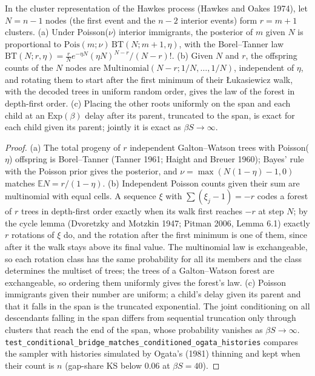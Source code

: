 \begin{proposition}\label{prop:simhawkesbridge}
In the cluster representation of the Hawkes process (Hawkes and Oakes 1974), let $N=n-1$ nodes (the first event and
the $n-2$ interior events) form $r=m+1$ clusters. (a) Under Poisson($\nu$) interior immigrants, the posterior of $m$
given $N$ is proportional to $\mathrm{Pois}(m;\nu)\,\mathrm{BT}(N;m+1,\eta)$, with the Borel--Tanner law
$\mathrm{BT}(N;r,\eta)=\frac rN e^{-\eta N}(\eta N)^{N-r}/(N-r)!$. (b) Given $N$ and $r$, the offspring counts of the
$N$ nodes are $\mathrm{Multinomial}(N-r;1/N,\dots,1/N)$, independent of $\eta$, and rotating them to start after the
first minimum of their {\L}ukasiewicz walk, with the decoded trees in uniform random order, gives the law of the forest
in depth-first order. (c) Placing the other roots uniformly on the span and each child at an $\mathrm{Exp}(\beta)$
delay after its parent, truncated to the span, is exact for each child given its parent; jointly it is exact as
$\beta S\to\infty$.
\end{proposition}
\begin{proof}
(a) The total progeny of $r$ independent Galton--Watson trees with Poisson($\eta$) offspring is Borel--Tanner
(Tanner 1961; Haight and Breuer 1960); Bayes' rule with the Poisson prior gives the posterior, and
$\nu=\max(N(1-\eta)-1,0)$ matches $\mathbb E N=r/(1-\eta)$. (b) Independent Poisson counts given their sum are
multinomial with equal cells. A sequence $\xi$ with $\sum(\xi_j-1)=-r$ codes a forest of $r$ trees in depth-first
order exactly when its walk first reaches $-r$ at step $N$; by the cycle lemma (Dvoretzky and Motzkin 1947; Pitman
2006, Lemma 6.1) exactly $r$ rotations of $\xi$ do, and the rotation after the first minimum is one of them, since
after it the walk stays above its final value. The multinomial law is exchangeable, so each rotation class has the
same probability for all its members and the class determines the multiset of trees; the trees of a Galton--Watson
forest are exchangeable, so ordering them uniformly gives the forest's law. (c) Poisson immigrants given their number
are uniform; a child's delay given its parent and that it falls in the span is the truncated exponential. The joint
conditioning on all descendants falling in the span differs from sequential truncation only through clusters that
reach the end of the span, whose probability vanishes as $\beta S\to\infty$.
\texttt{test\_conditional\_bridge\_matches\_conditioned\_ogata\_histories} compares the sampler with histories
simulated by Ogata's (1981) thinning and kept when their count is $n$ (gap-share KS below 0.06 at $\beta S=40$).
\end{proof}

